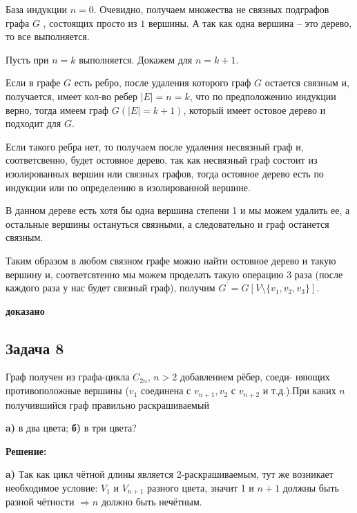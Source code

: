 \documentclass[a4paper,14pt]{article} %
\begin{document}
База индукции $n = 0$. Очевидно, получаем множества не связных подграфов графа $G$ , состоящих просто из $1$ вершины. А так как одна вершина -- это дерево, то все выполняется.

Пусть при $n=k$ выполняется. Докажем для $n = k + 1$.

Если в графе $G$ есть ребро, после удаления которого граф $G$ остается связным и, получается, имеет кол-во ребер $|E| = n = k$,  что по предположению индукции верно, тогда имеем граф $G(|E| = k+1)$, который имеет остовое дерево и подходит для $G$.

Если такого ребра нет, то получаем после удаления несвязный граф и, соответсвенно, будет остовное дерево, так как несвязный граф состоит из изолированных вершин или связных графов, тогда остовное дерево есть по индукции или по определению в изолированной вершине.

В данном дереве есть хотя бы одна вершина степени 1 и мы можем удалить ее, а остальные вершины остануться связными, а следовательно и граф останется связным.

Таким образом в любом связном графе можно найти остовное дерево и такую вершину и, соответсвтенно мы можем проделать такую операцию $3$ раза (после каждого раза у нас будет связный граф), получим $G^{\textbf{'}} = G[V\setminus \{ v_1,v_2,v_3\} ]$.

\begin{flushright}
\begin{large}
\textbf {доказано }
\end{large}
\end{flushright}


\begin{center}
\subsection{Задача 8}
\end{center}

 Граф получен из графа-цикла $C_{2n}$, $n > 2$ добавлением рёбер, соеди-
няющих противоположные вершины ($v_1$ соединена с $v_{n+1}, v_2$ с $v_{n+2}$ и т.д.).При каких $n$ получившийся граф правильно раскрашиваемый

{\bf a)} в два цвета; {\bf б)} в три цвета?
\begin{center}
\bfseries
{\Large Решение: }
\end{center}

{\bf a)} Так как цикл чётной длины является 2-раскрашиваемым, тут же возникает необходимое условие: $V_1$ и $V_{n + 1}$ разного цвета, значит 1 и $n+1$ должны быть разной чётности $ \Rightarrow n$ должно быть нечётным.
\end{document}
